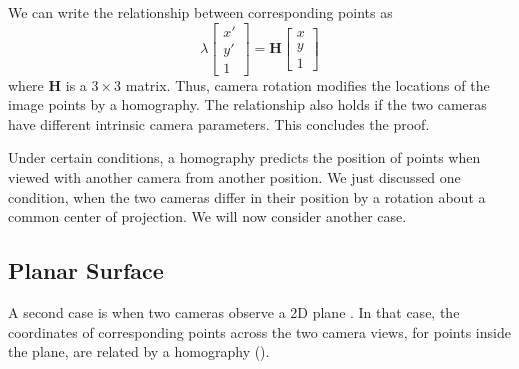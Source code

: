 We can write the relationship between corresponding points as
\begin{equation}
    \lambda 
    \begin{bmatrix}
    x' \\
    y' \\
    1
    \end{bmatrix}
    =
    \mathbf{H} 
    \begin{bmatrix}
    x \\
    y \\
    1
    \end{bmatrix}
\end{equation}
where $\mathbf{H}$ is a $3\times3$  matrix.  Thus, camera rotation modifies the locations of the image points by a homography. The relationship also holds if the two cameras have different intrinsic camera parameters. This concludes the proof.


Under certain conditions, a homography predicts the position of points when viewed with another camera from another position. We just discussed one condition, when the two cameras differ in their position by a rotation about a common center of projection.  We will now consider another case.

\subsection{Planar Surface}

A second case is when two cameras observe a 2D plane \cite{Hartley2004}. In that case, the coordinates of corresponding points across the two camera views, for points inside the plane, are related by a homography (\fig{\ref{fig:example_two_images_facade}}).  




